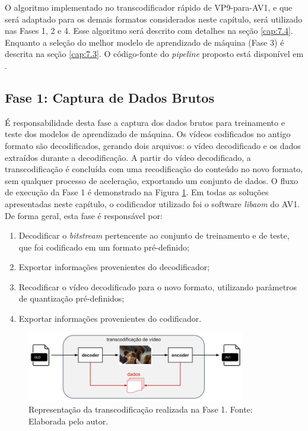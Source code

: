 O algoritmo implementado no transcodificador rápido de VP9-para-AV1, e que será adaptado para os demais formatos considerados neste capítulo, será utilizado nas Fases 1, 2 e 4. Esse algoritmo será descrito com detalhes na seção \ref{cap:7.4}. Enquanto a seleção do melhor modelo de aprendizado de máquina (Fase 3) é descrita na seção \ref{cap:7.3}. O código-fonte do \textit{pipeline} proposto está disponível em \citet{bib:prototipotese}.

\subsection{Fase 1: Captura de Dados Brutos}
\label{cap:7.2.1}

É responsabilidade desta fase a captura dos dados brutos para treinamento e teste dos modelos de aprendizado de máquina. Os vídeos codificados no antigo formato são decodificados, gerando dois arquivos: o vídeo decodificado e os dados extraídos durante a decodificação. A partir do vídeo decodificado, a transcodificação é concluída com uma recodificação do conteúdo no novo formato, sem qualquer processo de aceleração, exportando um conjunto de dados. O fluxo de execução da Fase 1 é demonstrado na Figura \ref{fig:26}. Em todas as soluções apresentadas neste capítulo, o codificador utilizado foi o software \textit{libaom} do AV1. De forma geral, esta fase é responsável por:

\begin{enumerate}[1.]
    \item Decodificar o \textit{bitstream} pertencente ao conjunto de treinamento e de teste, que foi codificado em um formato pré-definido;

    \item Exportar informações provenientes do decodificador;

    \item Recodificar o vídeo decodificado para o novo formato, utilizando parâmetros de quantização pré-definidos;

    \item Exportar informações provenientes do codificador.
\end{enumerate}

\begin{figure}
    \centering
    \includegraphics[width=0.85\textwidth]{FIGURES/fig_26.png}
    \caption{Representação da transcodificação realizada na Fase 1. Fonte: Elaborada pelo autor.}
    \label{fig:26}
\end{figure}


